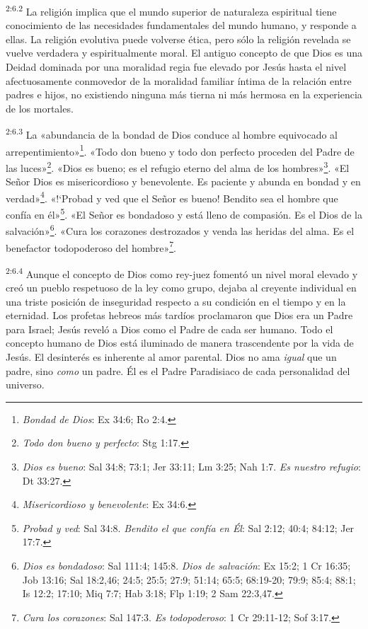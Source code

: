 \par
\textsuperscript{2:6.2} La religión implica que el mundo superior de naturaleza espiritual tiene conocimiento de las necesidades fundamentales del mundo humano, y responde a ellas. La religión evolutiva puede volverse ética, pero sólo la religión revelada se vuelve verdadera y espiritualmente moral. El antiguo concepto de que Dios es una Deidad dominada por una moralidad regia fue elevado por Jesús hasta el nivel afectuosamente conmovedor de la moralidad familiar íntima de la relación entre padres e hijos, no existiendo ninguna más tierna ni más hermosa en la experiencia de los mortales.

\par
\textsuperscript{2:6.3} La «abundancia de la bondad de Dios conduce al hombre equivocado al arrepentimiento»\footnote{\textit{Bondad de Dios}: Ex 34:6; Ro 2:4.}. «Todo don bueno y todo don perfecto proceden del Padre de las luces»\footnote{\textit{Todo don bueno y perfecto}: Stg 1:17.}. «Dios es bueno; es el refugio eterno del alma de los hombres»\footnote{\textit{Dios es bueno}: Sal 34:8; 73:1; Jer 33:11; Lm 3:25; Nah 1:7. \textit{Es nuestro refugio}: Dt 33:27.}. «El Señor Dios es misericordioso y benevolente. Es paciente y abunda en bondad y en verdad»\footnote{\textit{Misericordioso y benevolente}: Ex 34:6.}. «!`Probad y ved que el Señor es bueno! Bendito sea el hombre que confía en él»\footnote{\textit{Probad y ved}: Sal 34:8. \textit{Bendito el que confía en Él}: Sal 2:12; 40:4; 84:12; Jer 17:7.}. «El Señor es bondadoso y está lleno de compasión. Es el Dios de la salvación»\footnote{\textit{Dios es bondadoso}: Sal 111:4; 145:8. \textit{Dios de salvación}: Ex 15:2; 1 Cr 16:35; Job 13:16; Sal 18:2,46; 24:5; 25:5; 27:9; 51:14; 65:5; 68:19-20; 79:9; 85:4; 88:1; Is 12:2; 17:10; Miq 7:7; Hab 3:18; Flp 1:19; 2 Sam 22:3,47.}. «Cura los corazones destrozados y venda las heridas del alma. Es el benefactor todopoderoso del hombre»\footnote{\textit{Cura los corazones}: Sal 147:3. \textit{Es todopoderoso}: 1 Cr 29:11-12; Sof 3:17.}.

\par
\textsuperscript{2:6.4} Aunque el concepto de Dios como rey-juez fomentó un nivel moral elevado y creó un pueblo respetuoso de la ley como grupo, dejaba al creyente individual en una triste posición de inseguridad respecto a su condición en el tiempo y en la eternidad. Los profetas hebreos más tardíos proclamaron que Dios era un Padre para Israel; Jesús reveló a Dios como el Padre de cada ser humano. Todo el concepto humano de Dios está iluminado de manera trascendente por la vida de Jesús. El desinterés es inherente al amor parental. Dios no ama \textit{igual} que un padre, sino \textit{como} un padre. Él es el Padre Paradisiaco de cada personalidad del universo.

